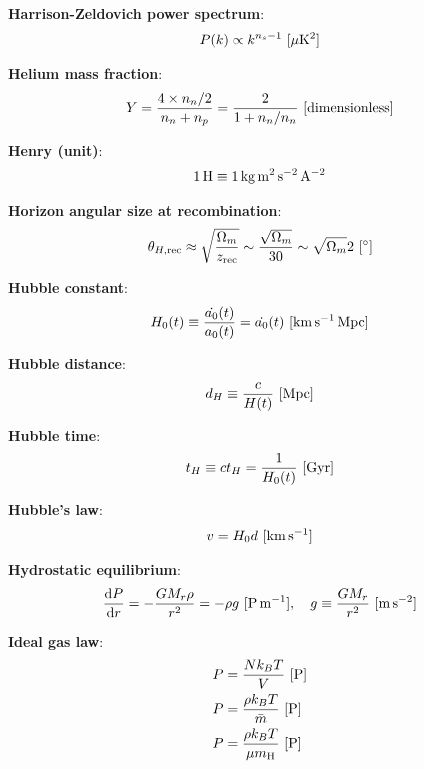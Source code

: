 \documentclass[a4paper,10pt]{article}
\begin{document}
{\noindent}\textbf{Harrison-Zeldovich power spectrum}:
\begin{align*}
    P(k) \propto k^{n_s-1} ~ [{\rm \mu K^2}]
\end{align*}

{\noindent}\textbf{Helium mass fraction}:
\begin{align*}
    Y = \frac{4\times n_n/2}{n_n + n_p}  = \frac{2}{1 + n_n/n_n} ~ [{\rm dimensionless}]
\end{align*}

{\noindent}\textbf{Henry (unit)}:
\begin{align*}
    {\rm 1\,H \equiv 1\,kg\,m^2\,s^{-2}\,A^{-2}}
\end{align*}

{\noindent}\textbf{Horizon angular size at recombination}:
\begin{align*}
    \theta_{H,\mathrm{rec}} \approx \sqrt{\frac{\Omega_m}{z_\mathrm{rec}}} \sim \frac{\sqrt{\Omega_m}}{30} \sim \sqrt{\Omega_m}2 ~ [{\rm ^\circ}]
\end{align*}

{\noindent}\textbf{Hubble constant}:
\begin{align*}
    H_0(t) \equiv \dfrac{\dot{a_0}(t)}{a_0(t)} = \dot{a_0}(t) ~ [{\rm km\,s^{-1}\,Mpc}]
\end{align*}

{\noindent}\textbf{Hubble distance}:
\begin{align*}
    d_H \equiv \frac{c}{H(t)} ~ [{\rm Mpc}]
\end{align*}

{\noindent}\textbf{Hubble time}:
\begin{align*}
    t_H \equiv ct_H = \frac{1}{H_0(t)} ~ [{\rm Gyr}]
\end{align*}

{\noindent}\textbf{Hubble's law}:
\begin{align*}
    v = H_0d ~ [{\rm km\,s^{-1}}]
\end{align*}

{\noindent}\textbf{Hydrostatic equilibrium}:
\begin{align*}
    \frac{{\rm d}P}{{\rm d}r} = -\frac{GM_r\rho}{r^2} = -\rho g ~ [{\rm P\,m^{-1}}], ~~~ g \equiv \frac{GM_r}{r^2} ~ [{\rm m\,s^{-2}}]
\end{align*}

{\noindent}\textbf{Ideal gas law}:
\begin{align*}
    P &= \frac{Nk_BT}{V} ~ [{\rm P}] \\
    P &= \frac{\rho k_BT}{\bar{m}} ~ [{\rm P}] \\
    P &= \frac{\rho k_BT}{\mu m_{\rm H}} ~ [{\rm P}]
\end{align*}
\end{document}
